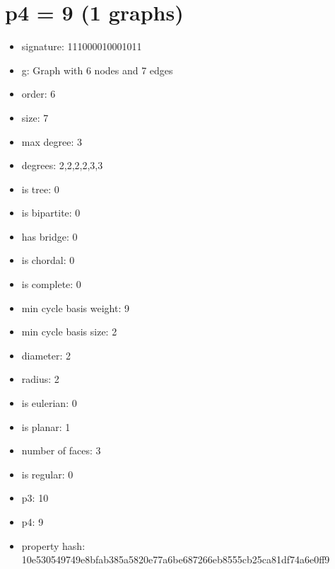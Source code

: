 \chapter{p4 = 9 (1 graphs)}
\newpage\begin{figure}
\end{figure}
\begin{itemize}
\item signature: 111000010001011
\item g: Graph with 6 nodes and 7 edges
\item order: 6
\item size: 7
\item max degree: 3
\item degrees: 2,2,2,2,3,3
\item is tree: 0
\item is bipartite: 0
\item has bridge: 0
\item is chordal: 0
\item is complete: 0
\item min cycle basis weight: 9
\item min cycle basis size: 2
\item diameter: 2
\item radius: 2
\item is eulerian: 0
\item is planar: 1
\item number of faces: 3
\item is regular: 0
\item p3: 10
\item p4: 9
\item property hash: 10e530549749e8bfab385a5820e77a6be687266eb8555cb25ca81df74a6e0ff9
\end{itemize}
\newpage
